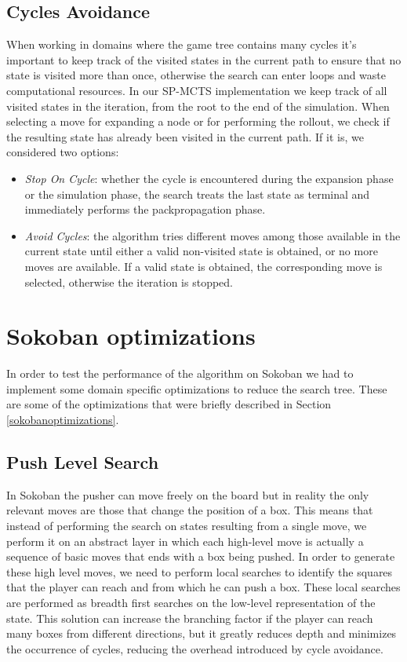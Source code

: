 \subsection{Cycles Avoidance}
When working in domains where the game tree contains many cycles it's important to keep track of the visited states in the current path to ensure that no state is visited more than once, otherwise the search can enter loops and waste computational resources. In our SP-MCTS implementation we keep track of all visited states in the iteration, from the root to the end of the simulation. When selecting a move for expanding a node or for performing the rollout, we check if the resulting state has already been visited in the current path. If it is, we considered two options:
\begin{itemize}
    \item \textit{Stop On Cycle}: whether the cycle is encountered during the expansion phase or the simulation phase, the search treats the last state as terminal and immediately performs the packpropagation phase.
    \item \textit{Avoid Cycles}: the algorithm tries different moves among those available in the current state until either a valid non-visited state is obtained, or no more moves are available. If a valid state is obtained, the corresponding move is selected, otherwise the iteration is stopped.
\end{itemize}

\section{Sokoban optimizations}
In order to test the performance of the algorithm on Sokoban we had to implement some domain specific optimizations to reduce the search tree. These are some of the optimizations that were briefly described in Section \ref{sokobanoptimizations}.

\subsection{Push Level Search}
In Sokoban the pusher can move freely on the board but in reality the only relevant moves are those that change the position of a box. This means that instead of performing the search on states resulting from a single move, we perform it on an abstract layer in which each high-level move is actually a sequence of basic moves that ends with a box being pushed. In order to generate these high level moves, we need to perform local searches to identify the squares that the player can reach and from which he can push a box. These local searches are performed as breadth first searches on the low-level representation of the state. This solution can increase the branching factor if the player can reach many boxes from different directions, but it greatly reduces depth and minimizes the occurrence of cycles, reducing the overhead introduced by cycle avoidance.

